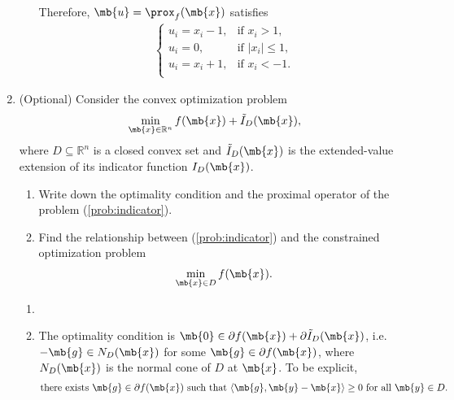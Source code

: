 \begin{exercise}
\begin{enumerate}
\begin{solution}
\begin{enumerate}
\begin{align*}
                        \end{align*}
                        Therefore, $\mb{u} = \prox_f(\mb{x})$ satisfies
                        \begin{align*}
                            \begin{cases}
                                u_i = x_i - 1, & \text{if } x_i > 1,     \\
                                u_i = 0,       & \text{if } |x_i| \le 1, \\
                                u_i = x_i + 1, & \text{if } x_i < -1.    \\
                            \end{cases}
                            \tag*{\qedhere}
                        \end{align*}
                \end{enumerate}
            \end{solution}


        \item (Optional) Consider the convex optimization problem
            \begin{align}\label{prob:indicator}
                \min_{\mb{x}\in\mathbb{R}^n} f(\mb{x})+\tilde{I}_D(\mb{x}),
            \end{align}
            where $D\subseteq\mathbb{R}^n$ is a closed convex set and $\tilde{I}_D(\mb{x})$ is the extended-value extension of its indicator function $I_D(\mb{x})$.
            \begin{enumerate}
                \item Write down the optimality condition and the proximal operator of the problem (\ref{prob:indicator}).
                \item Find the relationship between (\ref{prob:indicator}) and the constrained optimization problem
                    \begin{align*}
                        \min_{\mb{x}\in D} f(\mb{x}).
                    \end{align*}
            \end{enumerate}

            \begin{solution}
                \begin{enumerate}
                    \item []
                    \item The optimality condition is $\mb{0}\in \partial f(\mb{x}) + \partial \tilde{I}_D(\mb{x})$, i.e. $-\mb{g} \in N_D(\mb{x})$ for some $\mb{g} \in \partial f(\mb{x})$, where $N_D(\mb{x})$ is the normal cone of $D$ at $\mb{x}$. To be explicit,
                        \begin{align*}
                            \text{there exists $\mb{g} \in \partial f(\mb{x})$ such that $\langle\mb{g},\mb{y}-\mb{x}\rangle \ge 0$ for all $\mb{y} \in D$.}
                        \end{align*}


\end{enumerate}
\end{solution}
\end{enumerate}
\end{exercise}
